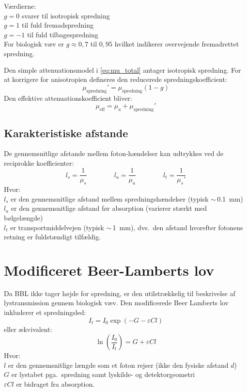 Værdierne:   \\
$g = 0$ svarer til isotropisk spredning \\ 
$g = 1$ til fuld fremadspredning \\
$g = -1$ til fuld tilbagespredning \\ 
For biologisk væv er $g \approx 0{,}7$ til $0{,}95$ hvilket indikerer overvejende fremadrettet spredning.

Den simple attenuationsmodel i \cref{eq:mu_total} antager isotropisk spredning. For at korrigere for anisotropien defineres den reducerede spredningskoefficient:
\begin{equation}
    \mu_{\text{spredning}}' = \mu_{\text{spredning}} (1 - g)
    \label{eq:mu_s_red}
\end{equation}
Den effektive attenuationskoefficient bliver:
\begin{equation}
    \mu_{\text{eff}} = \mu_a + \mu_{\text{spredning}}'
    \label{eq:mu_eff}
\end{equation}

\subsection{Karakteristiske afstande}
De gennemsnitlige afstande mellem foton-hændelser kan udtrykkes ved de reciprokke koefficienter:
\begin{equation}
    l_s = \frac{1}{\mu_s} \qquad \qquad l_a = \frac{1}{\mu_a} \qquad \qquad l_t = \frac{1}{\mu_s'}
    \label{eq:mean_free_paths}
\end{equation}
Hvor: \\ 
$l_s$ er den gennemsnitlige afstand mellem spredningshændelser (typisk $\sim$\,\SI{0,1}{mm}) \\
$l_a$ er den gennemsnitlige afstand før absorption (varierer stærkt med bølgelængde) \\
$l_t$ er transportmiddelvejen (typisk $\sim$\,\SI{1}{mm}), dvs.\ den afstand hvorefter fotonens retning er fuldstændigt tilfældig.

\section{Modificeret Beer-Lamberts lov}
\label{sec:mbbl}

Da BBL ikke tager højde for spredning, er den utilstrækkelig til beskrivelse af lystransmission gennem biologisk væv. Den modificerede Beer Lamberts lov inkluderer et spredningsled:
\begin{equation}
    I_t = I_0 \exp\!\left(-G - \varepsilon C l\right)
    \label{eq:mbbl}
\end{equation}
eller ækvivalent:
\begin{equation}
    \ln\!\left(\frac{I_0}{I_t}\right) = G + \varepsilon C l
    \label{eq:mbbl_ln}
\end{equation}
Hvor: \\ 
$l$ er den gennemsnitlige længde som et foton rejser (ikke den fysiske afstand $d$)\\ 
$G$ er lystabet pga.\ spredning samt lyskilde- og detektorgeometri \\
$\varepsilon C l$ er bidraget fra absorption.

